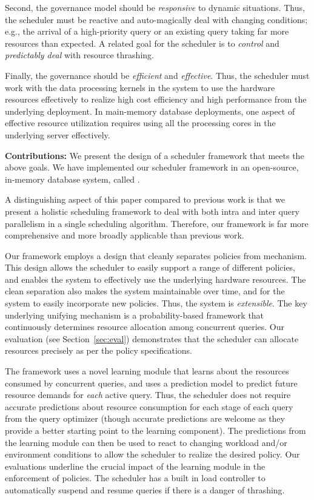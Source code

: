Second, the governance model should be \textit{responsive} to dynamic situations. 
Thus, the scheduler must be reactive and auto-magically deal with changing conditions; e.g., the arrival of a high-priority query or an existing query taking far more resources than expected. 
A related goal for the scheduler is to \textit{control} and \textit{predictably deal} with resource thrashing.

Finally, the governance should be \textit{efficient} and \textit{effective}. 
Thus, the scheduler must work with the data processing kernels in the system to use the hardware resources effectively to realize high cost efficiency and high performance from the underlying deployment. 
In main-memory database deployments, one aspect of effective resource utilization requires using all the processing cores in the underlying server effectively. 

\textbf{Contributions:} We present the design of a scheduler framework that meets the above goals. 
We have implemented our scheduler framework in an open-source, in-memory database system, called \sys{}.

A distinguishing aspect of this paper compared to previous work
is that we present a holistic scheduling framework to deal with both intra and inter query parallelism in a single scheduling algorithm. 
Therefore, our framework is far more comprehensive and more broadly applicable than previous work.

Our framework employs a design that cleanly separates policies from mechanism. 
This design allows the scheduler to easily support a range of different policies, and enables the system to effectively use the underlying hardware resources. 
The clean separation also makes the system maintainable over time, and for the system to easily incorporate new policies. 
Thus, the system is \textit{extensible}. 
The key underlying unifying mechanism is a probability-based framework that continuously determines resource allocation among concurrent queries.
Our evaluation (see Section~\ref{sec:eval}) demonstrates that the scheduler can allocate resources precisely as per the policy specifications. 

The framework uses a novel learning module that learns about the resources consumed by concurrent queries, and uses a prediction model to predict future resource demands for \textit{each} active query. 
Thus, the scheduler does not require accurate predictions about resource consumption for each stage of each query from the query optimizer (though accurate predictions are welcome as they provide a better starting point to the learning component). 
The predictions from the learning module can then be used to react to changing workload and/or environment conditions to allow the scheduler to realize the desired policy. 
Our evaluations underline the crucial impact of the learning module in the enforcement of policies.
The scheduler has a built in load controller to automatically suspend and resume queries if there is a danger of thrashing.

